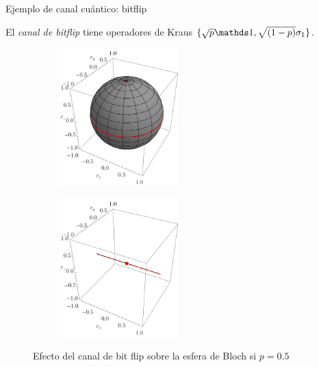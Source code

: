 \begin{frame}{Ejemplo de canal cuántico: bitflip}
    \begin{center}
        El \textit{canal de bitflip} tiene operadores de Kraus $\{\sqrt{p}\Id,\sqrt{(1-p)}\pauli{1}\}$.
    \end{center}
    \begin{figure}
        \centering
        \begin{subfigure}{0.45\textwidth}
            \centering
            \includegraphics[width=0.5\textwidth]{figures/whole_sphere.png}
        \end{subfigure}
        \begin{subfigure}{0.45\textwidth}
            \centering
            \includegraphics[width=0.5\textwidth]{figures/bitflip.png}
        \end{subfigure}
        \caption{Efecto del canal de bit flip sobre la esfera de Bloch si $p=0.5$}
    \end{figure}
\end{frame}
